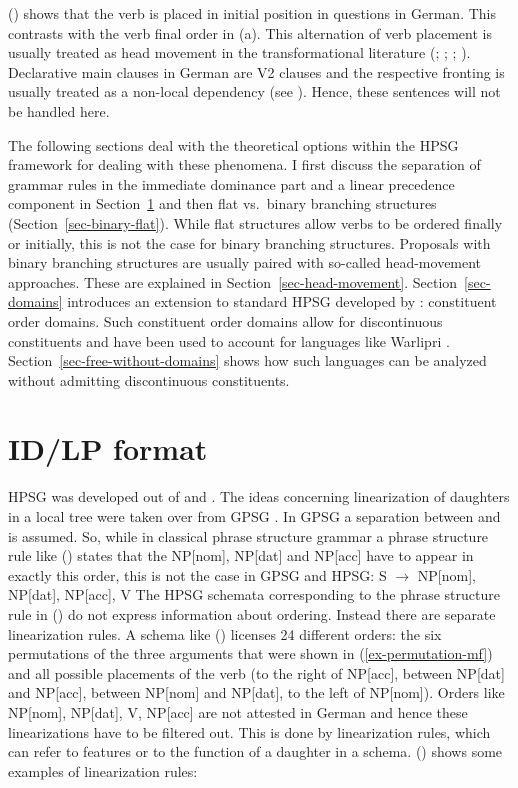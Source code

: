 \documentclass[output=paper]{langsci/langscibook}
\begin{document}
() shows that the verb is placed in initial position in questions in German. This contrasts
with the verb final order in (a). This alternation of verb placement is usually treated as
head movement in the transformational literature (\citealp{Bach62a}; \citealp*[]{Bierwisch63};
\citealp{Reis74a}; \citealp[Chapter~1]{Thiersch78a}). Declarative main clauses in German are V2
clauses and the respective fronting is usually treated as a non-local dependency (see
). Hence, these sentences will not be handled here.

The following sections deal with the theoretical options within the HPSG framework for dealing with
these phenomena. I first discuss the separation of grammar rules in the immediate dominance part and
a linear precedence component in Section~\ref{sec-id-lp} and then flat vs.\ binary branching
structures (Section~\ref{sec-binary-flat}). While flat structures allow verbs to be ordered finally
or initially, this is not the case for binary branching structures. Proposals with binary branching
structures are usually paired with so-called head-movement approaches. These are explained in Section~\ref{sec-head-movement}.
Section~\ref{sec-domains} introduces an extension to
standard HPSG developed by \citet{Reape94a}: constituent order domains. Such constituent
order domains allow for discontinuous constituents and have been used to account for languages like Warlipri
\citep{DS99a}. Section~\ref{sec-free-without-domains} shows how such languages can be analyzed without admitting discontinuous constituents.


\section{ID/LP format}
\label{sec-id-lp}

HPSG was developed out of  and . The ideas concerning linearization of
daughters in a local tree were taken over from GPSG \citep*{GKPS85a}. In GPSG a separation between
 and  is assumed. So, while in classical phrase structure
grammar a phrase structure rule like () states that the NP[nom], NP[dat] and NP[acc] have to
appear in exactly this order, this is not the case in GPSG and HPSG:
\ea
S $\to$ NP[nom], NP[dat], NP[acc], V
\z
The HPSG schemata corresponding to the phrase structure rule in () do not express information
about ordering. Instead there are separate linearization rules. A schema like () licenses 24 
different orders: the six permutations of the three arguments that were shown in
(\ref{ex-permutation-mf}) and all possible placements of the verb (to the right of NP[acc], between
NP[dat] and NP[acc], between NP[nom] and NP[dat], to the left of NP[nom]). Orders like NP[nom],
NP[dat], V, NP[acc] are not attested in German and hence these linearizations have to be filtered
out. This is done by linearization rules, which can refer to features or to the function of a
daughter in a schema. () shows some examples of linearization rules:
\end{document}
